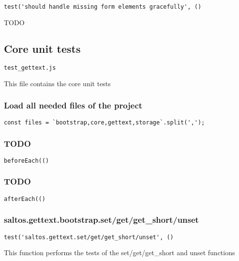 \documentclass[a4paper]{article}
\begin{document}
\begin{lstlisting}
test('should handle missing form elements gracefully', ()
\end{lstlisting}

TODO

\hypertarget{toc617}{}
\subsection{Core unit tests}

\begin{lstlisting}
test_gettext.js
\end{lstlisting}

This file contains the core unit tests

\hypertarget{toc618}{}
\subsubsection{Load all needed files of the project}

\begin{lstlisting}
const files = `bootstrap,core,gettext,storage`.split(',');
\end{lstlisting}

\hypertarget{toc619}{}
\subsubsection{TODO}

\begin{lstlisting}
beforeEach(()
\end{lstlisting}

\hypertarget{toc620}{}
\subsubsection{TODO}

\begin{lstlisting}
afterEach(()
\end{lstlisting}

\hypertarget{toc621}{}
\subsubsection{saltos.gettext.bootstrap.set/get/get\_short/unset}

\begin{lstlisting}
test('saltos.gettext.set/get/get_short/unset', ()
\end{lstlisting}

This function performs the tests of the set/get/get\_short and unset functions
\end{document}
